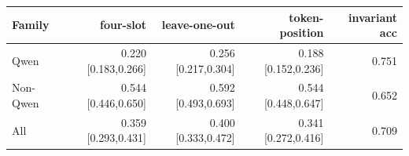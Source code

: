 \begin{tabular}{lrrrr}
\toprule
Family & four-slot & leave-one-out & token-position & invariant acc \\
\midrule
Qwen & 0.220 [0.183,0.266] & 0.256 [0.217,0.304] & 0.188 [0.152,0.236] & 0.751 \\
Non-Qwen & 0.544 [0.446,0.650] & 0.592 [0.493,0.693] & 0.544 [0.448,0.647] & 0.652 \\
All & 0.359 [0.293,0.431] & 0.400 [0.333,0.472] & 0.341 [0.272,0.416] & 0.709 \\
\bottomrule
\end{tabular}
